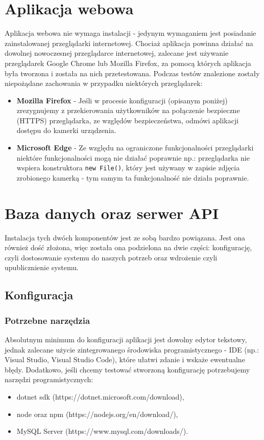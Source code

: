 \documentclass{article}
\begin{document}
\section{Aplikacja webowa}
Aplikacja webowa nie wymaga instalacji - jedynym wymaganiem jest posiadanie zainstalowanej przeglądarki internetowej. Chociaż aplikacja powinna działać na dowolnej nowoczesnej przeglądarce internetowej, zalecane jest używanie przeglądarek Google Chrome lub Mozilla Firefox, za pomocą których aplikacja była tworzona i została na nich przetestowana. Podczas testów znalezione zostały niepożądane zachowania w przypadku niektórych przeglądarek: 
\begin{itemize}
	\item \textbf{Mozilla Firefox} - Jeśli w procesie konfiguracji (opisanym poniżej) \linebreak  zrezygnujemy z przekierowania użytkowników na połączenie bezpieczne (HTTPS) przeglądarka, ze względów bezpieczeństwa, odmówi aplikacji dostępu do kamerki urządzenia.
	\item \textbf{Microsoft Edge} - Ze względu na ograniczone funkcjonalności przeglądarki niektóre funkcjonalności mogą nie działać poprawnie np.: przeglądarka nie wspiera konstruktora \verb"new File()", który jest używany w zapisie zdjęcia zrobionego kamerką - tym samym ta funkcjonalność nie działa poprawnie.
\end{itemize}
\section{Baza danych oraz serwer API}
Instalacja tych dwóch komponentów jest ze sobą bardzo powiązana. Jest ona również dość złożona, więc została ona podzielona na dwie części: konfigurację, czyli dostosowanie systemu do naszych potrzeb oraz wdrożenie czyli upublicznienie systemu.
\subsection{Konfiguracja}
\subsubsection{Potrzebne narzędzia}
Absolutnym minimum do konfiguracji aplikacji jest dowolny edytor tekstowy, jednak zalecane użycie zintegrowanego środowiska programistycznego - IDE (np.: Visual Studio, Visual Studio Code), które ułatwi zdanie i wskaże ewentualne błędy. Dodatkowo, jeśli chcemy testować stworzoną konfigurację potrzebujemy narzędzi programistycznych: 
\begin{itemize}
    \item dotnet sdk (https://dotnet.microsoft.com/download), 
    \item node oraz npm (https://nodejs.org/en/download/), 
    \item MySQL Server (https://www.mysql.com/downloads/). 
\end{itemize} 
\end{document}
